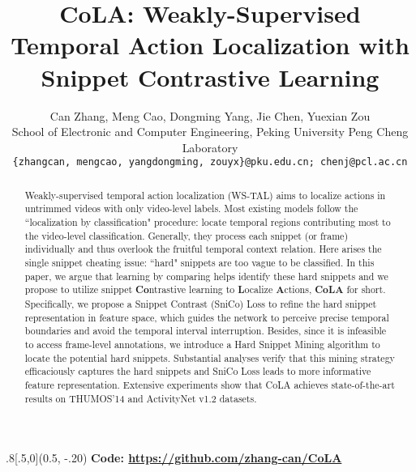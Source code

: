 \documentclass[final]{cvpr}
\begin{document}
\title{CoLA: Weakly-Supervised Temporal Action Localization with \\Snippet Contrastive Learning}

\author{Can Zhang, Meng Cao, Dongming Yang, Jie Chen, Yuexian Zou\\
School of Electronic and Computer Engineering, Peking University Peng Cheng Laboratory\\
{\tt\small \{zhangcan, mengcao, yangdongming, zouyx\}@pku.edu.cn; chenj@pcl.ac.cn}
}

\maketitle
\pagestyle{empty}
\thispagestyle{empty}


\begin{textblock*}{.8\textwidth}[.5,0](0.5\textwidth, -.20\textwidth)
\centering
{\textbf{Code: \url{https://github.com/zhang-can/CoLA}}}
\end{textblock*}

\begin{abstract}
Weakly-supervised temporal action localization (WS-TAL) aims to localize actions in untrimmed videos with only video-level labels. Most existing models follow the ``localization by classification" procedure: locate temporal regions contributing most to the video-level classification. Generally, they process each snippet (or frame) individually and thus overlook the fruitful temporal context relation. Here arises the single snippet cheating issue: ``hard" snippets are too vague to be classified. In this paper, we argue that learning by comparing helps identify these hard snippets and we propose to utilize snippet \textbf{Co}ntrastive learning to \textbf{L}ocalize \textbf{A}ctions, \textbf{CoLA} for short. Specifically, we propose a Snippet Contrast (SniCo) Loss to refine the hard snippet representation in feature space, which guides the network to perceive precise temporal boundaries and avoid the temporal interval interruption. Besides, since it is infeasible to access frame-level annotations, we introduce a Hard Snippet Mining algorithm to locate the potential hard snippets. Substantial analyses verify that this mining strategy efficaciously captures the hard snippets and SniCo Loss leads to more informative feature representation. Extensive experiments show that CoLA achieves state-of-the-art results on THUMOS'14 and ActivityNet v1.2 datasets. 
\end{abstract} 
\vspace{-6pt}
\end{document}
